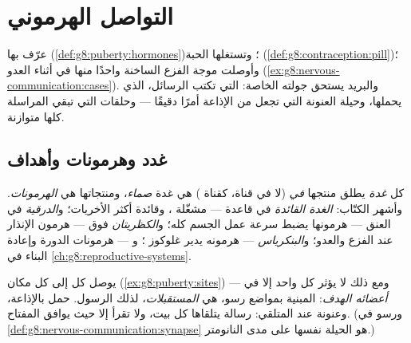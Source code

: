 \chapter{التواصل الهرموني}\label{ch:g8:hormonal-communication}

عرّف بها 
(\cref{def:g8:puberty:hormones})؛ وتستغلها الحبة
(\cref{def:g8:contraception:pill})؛ وأوصلت موجة الفزع
الساخنة واحدًا منها في أثناء العدو
(\cref{ex:g8:nervous-communication:cases}). والبريد يستحق
جولته الخاصة:  التي تكتب الرسائل،  الذي
يحملها، وحيلة العنونة التي تجعل من الإذاعة أمرًا دقيقًا
--- وحلقات  التي تبقي المراسلة كلها
متوازنة.

\section{غدد وهرمونات وأهداف}

\begin{definition}\label{def:g8:hormonal-communication:glands}
كل \emph{غدة} يطلق منتجها \emph{في } (لا
في قناة، كقناة ) هي غدة \emph{صماء}، ومنتجاتها هي
\emph{الهرمونات}. وأشهر الكتّاب:
\emph{الغدة القائدة} في قاعدة  --- مشغّلة ،
وقائدة أكثر الأخريات؛ و\emph{الدرقية} في العنق ---
هرمونها يضبط سرعة عمل الجسم كله؛ و\emph{الكظريتان} فوق
 --- هرمون الإنذار عند الفزع والعدو؛
و\emph{البنكرياس} --- هرمونه يدير غلوكوز ؛
و\emph{ } --- هرمونات الدورة وإعادة
البناء في \cref{ch:g8:reproductive-systems}.
\end{definition}

\begin{proposition}\label{prop:g8:hormonal-communication:address}
يوصل  كل  إلى كل مكان
(\cref{ex:g8:puberty:sites}) --- ومع ذلك لا يؤثر كل
واحد إلا في \emph{أعضائه الهدف}: 
المبنية بمواضع رسو، هي \emph{المستقبلات}، لذلك الرسول.
حمل بالإذاعة، وعنونة عند المتلقي: رسالة يتلقاها كل بيت،
ولا تقرأ إلا حيث يوافق المفتاح. (ورسو  في
\cref{def:g8:nervous-communication:synapse} هو الحيلة
نفسها على مدى النانومتر.)
\end{proposition}
\admitted


